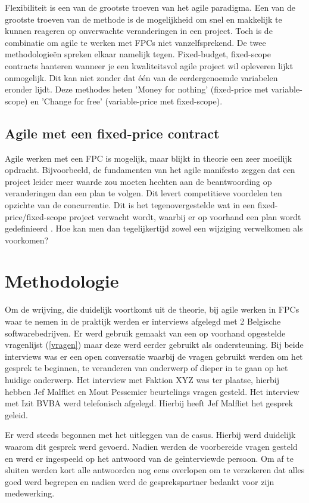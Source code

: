 \documentclass{hogent-article}
\begin{document}
    Flexibiliteit is een van de grootste troeven van het agile paradigma. Een van de grootste troeven van de methode is de mogelijkheid om snel en makkelijk te kunnen reageren op onverwachte veranderingen in een project. Toch is de combinatie om agile te werken met FPCs niet vanzelfsprekend. De twee methodologieën spreken elkaar namelijk tegen. Fixed-budget, fixed-scope contracts hanteren wanneer je een kwaliteitsvol agile project wil opleveren lijkt onmogelijk. Dit kan niet zonder dat één van de eerdergenoemde variabelen eronder lijdt. Deze methodes heten 'Money for nothing' (fixed-price met variable-scope) en 'Change for free' (variable-price met fixed-scope). 
    
    \subsection{Agile met een fixed-price contract}
    Agile werken met een FPC is mogelijk, maar blijkt in theorie een zeer moeilijk opdracht. Bijvoorbeeld, de fundamenten van het agile manifesto zeggen dat een project leider meer waarde zou moeten hechten aan de beantwoording op veranderingen dan een plan te volgen. Dit levert competitieve voordelen ten opzichte van de concurrentie. Dit is het tegenovergestelde wat in een fixed-price/fixed-scope project verwacht wordt, waarbij er op voorhand een plan wordt gedefinieerd \autocite{PMI2011}. Hoe kan men dan tegelijkertijd zowel een wijziging verwelkomen als voorkomen?
	
	
	\section{Methodologie}
	Om de wrijving, die duidelijk voortkomt uit de theorie, bij agile werken in FPCs waar te nemen in de praktijk werden er interviews afgelegd met 2 Belgische softwarebedrijven. Er werd gebruik gemaakt van een op voorhand opgestelde vragenlijst (\ref{vragen}) maar deze werd eerder gebruikt als ondersteuning. Bij beide interviews was er een open conversatie waarbij de vragen gebruikt werden om het gesprek te beginnen, te veranderen van onderwerp of dieper in te gaan op het huidige onderwerp. Het interview met Faktion XYZ was ter plaatse, hierbij hebben Jef Malfliet en Mout Pessemier beurtelings vragen gesteld. Het interview met Izit BVBA werd telefonisch afgelegd. Hierbij heeft Jef Malfliet het gesprek geleid.
	
	Er werd steeds begonnen met het uitleggen van de casus.  Hierbij werd duidelijk waarom dit gesprek werd gevoerd. Nadien werden de voorbereide vragen gesteld en werd er ingespeeld op het antwoord van de geïnterviewde persoon. Om af te sluiten werden kort alle antwoorden nog eens overlopen om te verzekeren dat alles goed werd begrepen en nadien werd de gesprekspartner bedankt voor zijn medewerking.
	
\end{document}
